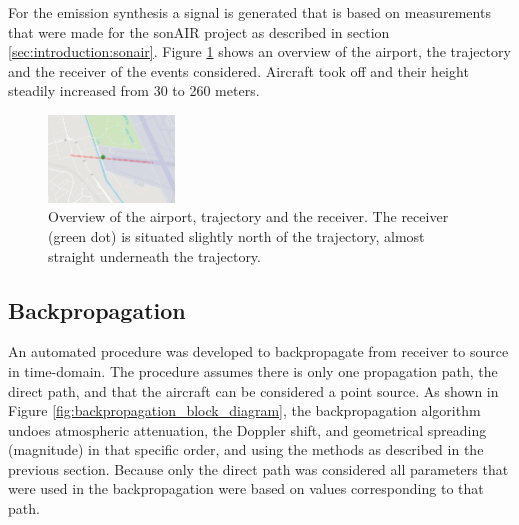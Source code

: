 
For the emission synthesis a signal is generated that is based on measurements
that were made for the sonAIR project as described in section
\ref{sec:introduction:sonair}. Figure \ref{fig:figure_trajectory} shows an
overview of the airport, the trajectory and the receiver of the events
considered. Aircraft took off and their height steadily increased from 30 to 260
meters.




\begin{figure}[H]
  \centering
  \includegraphics[width=0.3\textwidth]{../figures/manual/auralisation-paper/figure_trajectory}
  \caption{Overview of the airport, trajectory and the receiver. The receiver
(green dot) is situated slightly north of the trajectory, almost straight underneath the
trajectory.}
  \label{fig:figure_trajectory}
\end{figure}


\subsection{Backpropagation}
An automated procedure was developed to backpropagate from receiver to source in
time-domain. The procedure assumes there is only one propagation path,
the direct path, and that the aircraft can be considered a point source.
As shown in Figure \ref{fig:backpropagation_block_diagram}, the
backpropagation algorithm undoes atmospheric attenuation, the Doppler shift, and
geometrical spreading (magnitude) in that specific order, and using the methods as
described in the previous section.
Because only the direct path was considered all parameters that were used in the
backpropagation were based on values corresponding to that path.

